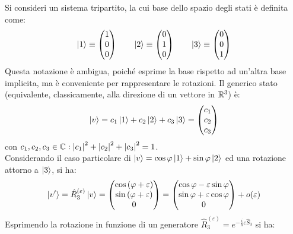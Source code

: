 Si consideri un sistema tripartito, la cui base dello spazio degli stati è definita come:
\begin{equation*}
	\ket{1} \equiv
	\begin{pmatrix}
		1 \\ 0 \\ 0
	\end{pmatrix}
	\qquad
	\ket{2} \equiv
	\begin{pmatrix}
		0 \\ 1 \\ 0
	\end{pmatrix}
	\qquad
	\ket{3} \equiv
	\begin{pmatrix}
		0 \\ 0 \\ 1
	\end{pmatrix}
\end{equation*}
Questa notazione è ambigua, poiché esprime la base rispetto ad un'altra base implicita, ma è conveniente per rappresentare le rotazioni. Il generico stato (equivalente, classicamente, alla direzione di un vettore in $ \mathbb{R}^3 $) è:
\begin{equation}
	\ket{v} = c_1 \ket{1} + c_2 \ket{2} + c_3 \ket{3} =
	\begin{pmatrix}
		c_1 \\ c_2 \\ c_3
	\end{pmatrix}
	\label{eq:2.37}
\end{equation}
con $ c_1,c_2,c_3 \in \mathbb{C} : \left\lvert c_1\right\rvert^2 + \left\lvert c_2\right\rvert^2 + \left\lvert c_3\right\rvert^2 = 1 $.\\
Considerando il caso particolare di $ \ket{v} = \cos \varphi \ket{1} + \sin \varphi \ket{2} $ ed una rotazione attorno a $ \ket{3} $, si ha:
\begin{equation}
	\ket{v'} = \hat{R}^{(\varepsilon)}_3 \ket{v} =
	\begin{pmatrix}
		\cos \left( \varphi + \varepsilon \right) \\ \sin \left( \varphi + \varepsilon \right) \\ 0
	\end{pmatrix}
	=
	\begin{pmatrix}
		\cos \varphi - \varepsilon \sin \varphi \\ \sin \varphi + \varepsilon \cos \varphi \\ 0
	\end{pmatrix}
	+ o(\varepsilon)
	\label{eq:2.38}
\end{equation}
Esprimendo la rotazione in funzione di un generatore $ \hat{R}^{(\varepsilon)}_3 = e^{-\frac{i}{\hbar} \varepsilon \hat{S}_3} $ si ha:
